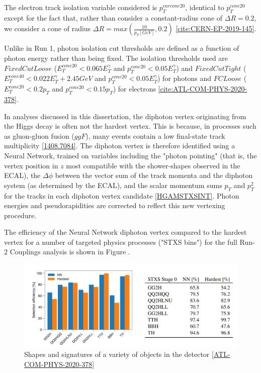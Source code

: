 The electron track isolation variable considered is $p_{T}^{varcone20}$, identical to $p_{T}^{cone20}$ except for the fact that, rather than consider a constant-radius cone of $\Delta R = 0.2$, we consider a cone of radius $\Delta R = max(\frac{10}{p_{T}[GeV]}, 0.2)$ \ref{cite:CERN-EP-2019-145}.

Unlike in Run 1, photon isolation cut thresholds are defined as a function of photon energy rather than being fixed. The isolation thresholds used are $FixedCutLoose$ ($E_{T}^{cone20}< 0.065 E_{T}^{\gamma}$ and $p_{T}^{cone20} < 0.05 E_{T}^{\gamma}$) and $FixedCutTight$ ($E_{T}^{cone40}< 0.022 E_{T}^{\gamma} + 2.45 GeV$ and $p_{T}^{cone20} < 0.05 E_{T}^{\gamma}$) for photons and $FCLoose$ ($E_{T}^{cone20}< 0.2 p_{T}$ and $p_{T}^{cone20} < 0.15 p_{T}$) for electrons \ref{cite:ATL-COM-PHYS-2020-378}.

In analyses discussed in this dissertation, the diphoton vertex originating from the Higgs decay is often not the hardest vertex. This is because, in processes such as gluon-gluon fusion ($ggF$), many events contain a low final-state track multiplicity \ref{1408.7084}. The diphoton vertex is therefore identified using a Neural Network, trained on variables including the "photon pointing" (that is, the vertex position in $z$ most compatible with the shower-shapes observed in the ECAL), the $\Delta \phi$ between the vector sum of the track momenta and the diphoton system (as determined by the ECAL), and the scalar momentum sums $p_{T}$ and $p_{T}^2$ for the tracks in each diphoton vertex candidate \ref{HGAMSTXSINT}. Photon energies and pseudorapidities are corrected to reflect this new vertexing procedure.

The efficiency of the Neural Network diphoton vertex compared to the hardest vertex for a number of targeted physics processes ("STXS bins") for the full Run-2 Couplings analysis is shown in Figure .

\begin{figure}
  \includegraphics[width=\linewidth]{figures/methods_chapter/Vertexing.png}
  \caption{Shapes and signatures of a variety of objects in the detector \ref{ATL-COM-PHYS-2020-378}}
  \label{fig:Vertexing}
\end{figure}

